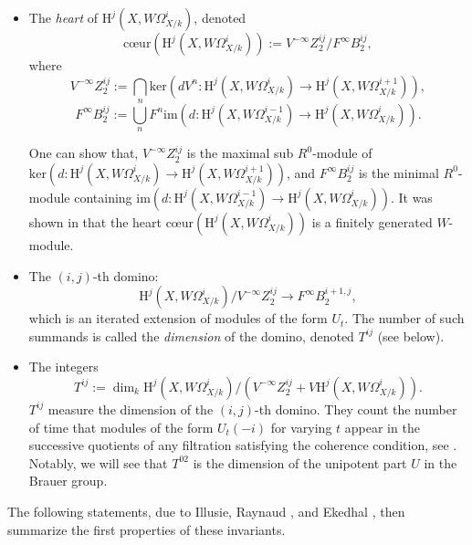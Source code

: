 \documentclass[a4paper,12pt,twoside]{report}
\newcommand{\HH}{\mathrm{H}}
\begin{document}
\begin{itemize}
    \item 
The \emph{heart} of $\HH^j(X,W\Omega^i_{X/k})$, denoted
\begin{equation*}
    \text{c\oe ur}(\HH^j(X,W\Omega^i_{X/k})):=V^{-\infty}Z_2^{ij}/F^{\infty}B_2^{ij},
\end{equation*}
where
\begin{equation*}
    V^{-\infty}Z_2^{ij}:=\bigcap_{n} \mathrm{ker}(dV^n: \HH^j(X,W\Omega^i_{X/k})\rightarrow \HH^j(X,W\Omega^{i+1}_{X/k})),
\end{equation*} 
\begin{equation*}
    F^{\infty}B_2^{ij}:=\bigcup_{n} F^n \mathrm{im}(d: \HH^j(X,W\Omega^{i-1}_{X/k})\rightarrow \HH^j(X,W\Omega^{i}_{X/k})).
\end{equation*}

One can show that, \(V^{-\infty}Z_2^{ij}\) is the maximal sub $R^0$-module of 
\(\mathrm{ker}(d:\HH^j(X,W\Omega^i_{X/k})\rightarrow \HH^j(X,W\Omega^{i+1}_{X/k}))\), 
and $F^\infty B_2^{ij}$ is the minimal $R^0$-module containing \(\mathrm{im}(d: \HH^j(X,W\Omega^{i-1}_{X/k})\rightarrow \HH^j(X,W\Omega^{i}_{X/k}))\). 
It was shown in \cite[Theorem II.3.1]{IR} that the heart $\text{c\oe ur}(\HH^j(X,W\Omega^i_{X/k}))$ 
is a finitely generated $W$-module. 

\item The $(i,j)$-th domino: \[\HH^j(X,W\Omega^i_{X/k})/V^{-\infty}Z_2^{ij}\rightarrow F^\infty B_2^{i+1,j},\]
which is an iterated extension of modules of the form $U_t$. 
The number of such summands is called the \emph{dimension} of the domino, denoted $T^{ij}$ (see below). 

\item The integers  \begin{equation}
    \label{Tij} T^{ij}:=\dim_k \HH^j(X,W\Omega^i_{X/k})/(V^{-\infty}Z_2^{ij}+
V\HH^j(X,W\Omega^i_{X/k})).
\end{equation} $T^{ij}$ measure the dimension of the $(i,j)$-th domino. 
They count the number of time that modules of the form $U_t(-i)$ for varying $t$ appear in the successive 
quotients of any filtration satisfying the coherence condition, see \cite[Proposition I.2.18]{IR}. 
Notably, we will see that $T^{02}$ is the dimension of the unipotent part $U$ in the Brauer group. 
\end{itemize}

The following statements, due to Illusie, Raynaud \cite{IR}, and Ekedhal \cite{Ek1}, then summarize the first properties of these invariants. 
\end{document}
